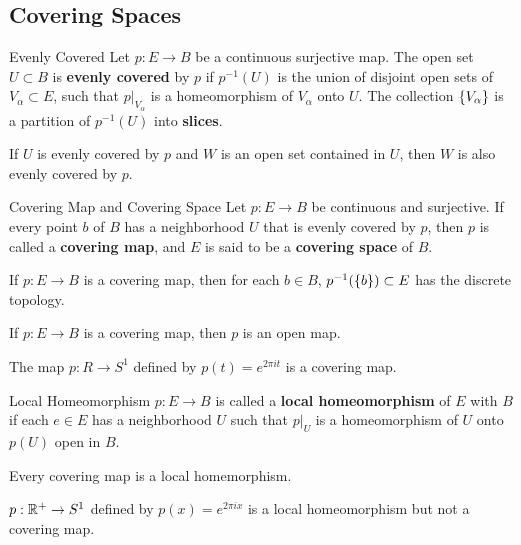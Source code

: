 \documentclass[12pt,a4paper]{article}
\begin{document}
    \subsection{Covering Spaces}
    \begin{defi}{Evenly Covered}
        Let $p:E\to B$ be a continuous surjective map. The open set $U\subset B$ is \textbf{evenly covered} by $p$ if $p^{-1}(U)$ is the union of disjoint open sets of $V_\alpha\subset E$, such that $p|_{V_\alpha}$ is a homeomorphism of $V_\alpha$ onto $U$. The collection $\left\{ V_\alpha \right\}$ is a partition of $p^{-1}(U)$ into \textbf{slices}.
    \end{defi}
    \begin{remark}
        If $U$ is evenly covered by $p$ and $W$ is an open set contained in $U$, then $W$ is also evenly covered by $p$.
    \end{remark}
    \bigskip

    \begin{defi}{Covering Map and Covering Space}
        Let $p:E\to B$ be continuous and surjective. If every point $b$ of $B$ has a neighborhood $U$ that is evenly covered by $p$, then $p$ is called a \textbf{covering map}, and $E$ is said to be a \textbf{covering space} of $B$.
    \end{defi}
    \begin{remark}
        If $p:E\to B$ is a covering map, then for each $b\in B$, $p^{-1}(\left\{ b \right\})\subset E$ has the discrete topology. 
    \end{remark}
    \begin{remark}
        If $p:E\to B$ is a covering map, then $p$ is an open map.
    \end{remark}
    \bigskip

    \begin{eg}
        The map $p:R\to S^1$ defined by $p(t)=e^{2\pi it}$ is a covering map.
    \end{eg}
    \bigskip

    \begin{defi}{Local Homeomorphism}
        $p:E\to B$ is called a \textbf{local homeomorphism} of $E$ with $B$ if each $e\in E$ has a neighborhood $U$ such that $p|_U$ is a homeomorphism of $U$ onto $p(U)$ open in $B$.
    \end{defi}  
    \begin{remark}
        Every covering map is a local homemorphism.
    \end{remark}
    \bigskip

    \begin{eg}
        $p:\mathbb{R}^+\to S^1$ defined by $p(x)=e^{2\pi ix}$ is a local homeomorphism but not a covering map.
    \end{eg}
    \bigskip
\end{document}

